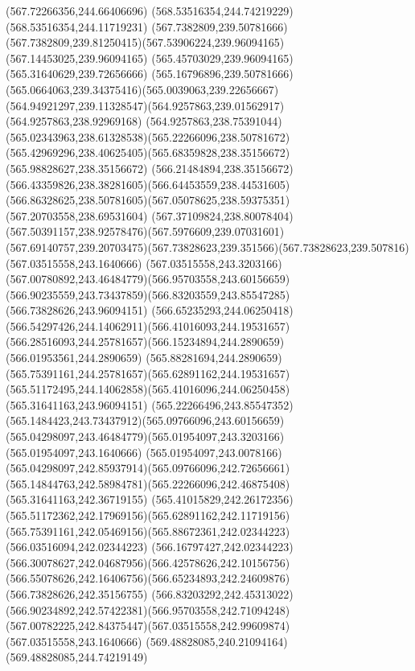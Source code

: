 {{	\lineto(567.72266356,244.66406696)
	\lineto(568.53516354,244.74219229)
	\lineto(568.53516354,244.11719231)
	\closepath
	\moveto(567.7382809,239.50781666)
	\curveto(567.7382809,239.81250415)(567.53906224,239.96094165)(567.14453025,239.96094165)
	\lineto(565.45703029,239.96094165)
	\lineto(565.31640629,239.72656666)
	\curveto(565.16796896,239.50781666)(565.0664063,239.34375416)(565.0039063,239.22656667)
	\curveto(564.94921297,239.11328547)(564.9257863,239.01562917)(564.9257863,238.92969168)
	\curveto(564.9257863,238.75391044)(565.02343963,238.61328538)(565.22266096,238.50781672)
	\curveto(565.42969296,238.40625405)(565.68359828,238.35156672)(565.98828627,238.35156672)
	\curveto(566.21484894,238.35156672)(566.43359826,238.38281605)(566.64453559,238.44531605)
	\curveto(566.86328625,238.50781605)(567.05078625,238.59375351)(567.20703558,238.69531604)
	\curveto(567.37109824,238.80078404)(567.50391157,238.92578476)(567.5976609,239.07031601)
	\curveto(567.69140757,239.20703475)(567.73828623,239.351566)(567.73828623,239.507816)
	\closepath
	\moveto(567.03515558,243.1640666)
	\curveto(567.03515558,243.3203166)(567.00780892,243.46484779)(566.95703558,243.60156659)
	\curveto(566.90235559,243.73437859)(566.83203559,243.85547285)(566.73828626,243.96094151)
	\curveto(566.65235293,244.06250418)(566.54297426,244.14062911)(566.41016093,244.19531657)
	\curveto(566.28516093,244.25781657)(566.15234894,244.2890659)(566.01953561,244.2890659)
	\curveto(565.88281694,244.2890659)(565.75391161,244.25781657)(565.62891162,244.19531657)
	\curveto(565.51172495,244.14062858)(565.41016096,244.06250458)(565.31641163,243.96094151)
	\curveto(565.22266496,243.85547352)(565.1484423,243.73437912)(565.09766096,243.60156659)
	\curveto(565.04298097,243.46484779)(565.01954097,243.3203166)(565.01954097,243.1640666)
	\curveto(565.01954097,243.0078166)(565.04298097,242.85937914)(565.09766096,242.72656661)
	\curveto(565.14844763,242.58984781)(565.22266096,242.46875408)(565.31641163,242.36719155)
	\curveto(565.41015829,242.26172356)(565.51172362,242.17969156)(565.62891162,242.11719156)
	\curveto(565.75391161,242.05469156)(565.88672361,242.02344223)(566.03516094,242.02344223)
	\curveto(566.16797427,242.02344223)(566.30078627,242.04687956)(566.42578626,242.10156756)
	\curveto(566.55078626,242.16406756)(566.65234893,242.24609876)(566.73828626,242.35156755)
	\curveto(566.83203292,242.45313022)(566.90234892,242.57422381)(566.95703558,242.71094248)
	\curveto(567.00782225,242.84375447)(567.03515558,242.99609874)(567.03515558,243.1640666)
	\closepath
	\moveto(569.48828085,240.21094164)
	\lineto(569.48828085,244.74219149)
}}
